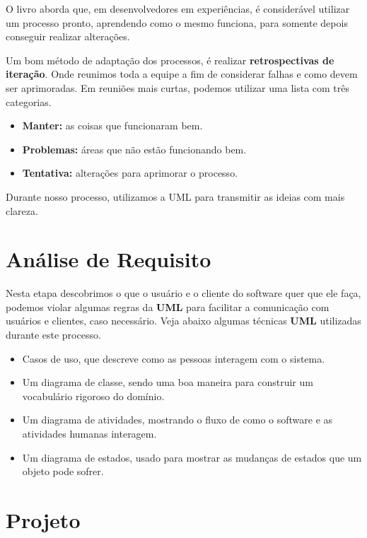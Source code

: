 \documentclass[a4paper, 12pt]{report}
\begin{document}
	O livro aborda que, em desenvolvedores em experiências, é considerável utilizar um processo pronto, aprendendo como o mesmo funciona, para somente depois conseguir realizar alterações.
	
	Um bom método de adaptação dos processos, é realizar \textbf{retrospectivas de iteração}. Onde reunimos toda a equipe a fim de considerar falhas e como devem ser aprimoradas. Em reuniões mais curtas, podemos utilizar uma lista com três categorias.
	
	\begin{itemize}
		\item \textbf{Manter:} as coisas que funcionaram bem.
		\item \textbf{Problemas:} áreas que não estão funcionando bem.
		\item \textbf{Tentativa:} alterações para aprimorar o processo.
	\end{itemize}

	Durante nosso processo, utilizamos a UML para transmitir as ideias com mais clareza.

	
	\section{Análise de Requisito}
	
	Nesta etapa descobrimos o que o usuário e o cliente do software quer que ele faça, podemos violar algumas regras da \textbf{UML} para facilitar a comunicação com usuários e clientes, caso necessário. Veja abaixo algumas técnicas \textbf{UML} utilizadas durante este processo.
	
	\begin{itemize}
		\item Casos de uso, que descreve como as pessoas interagem com o sistema.
		
		\item Um diagrama de classe, sendo uma boa maneira para construir um vocabulário rigoroso do domínio.
		
		\item Um diagrama de atividades, mostrando o fluxo de como o software e as atividades humanas interagem.
		
		\item Um diagrama de estados, usado para mostrar as mudanças de estados que um objeto pode sofrer.
	\end{itemize}

	\section{Projeto}
	
\end{document}
